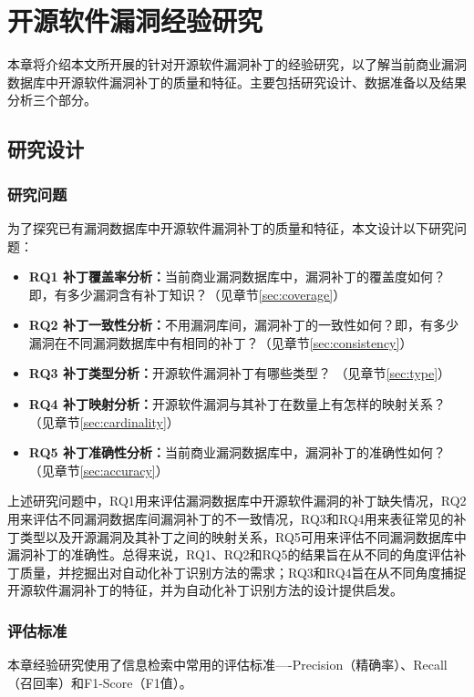 \chapter{开源软件漏洞经验研究}\label{sec:study}

本章将介绍本文所开展的针对开源软件漏洞补丁的经验研究，以了解当前商业漏洞数据库中开源软件漏洞补丁的质量和特征。主要包括研究设计、数据准备以及结果分析三个部分。


\section{研究设计}
\subsection{研究问题}
为了探究已有漏洞数据库中开源软件漏洞补丁的质量和特征，本文设计以下研究问题：

\begin{itemize}[leftmargin=*]
    \item \textbf{RQ1 补丁覆盖率分析：}当前商业漏洞数据库中，漏洞补丁的覆盖度如何？即，有多少漏洞含有补丁知识？（见章节\ref{sec:coverage}）
    \item \textbf{RQ2 补丁一致性分析：}不用漏洞库间，漏洞补丁的一致性如何？即，有多少漏洞在不同漏洞数据库中有相同的补丁？（见章节\ref{sec:consistency}）
    \item \textbf{RQ3 补丁类型分析：}开源软件漏洞补丁有哪些类型？ （见章节\ref{sec:type}）
    \item \textbf{RQ4 补丁映射分析：}开源软件漏洞与其补丁在数量上有怎样的映射关系？ （见章节\ref{sec:cardinality}）
    \item \textbf{RQ5 补丁准确性分析：}当前商业漏洞数据库中，漏洞补丁的准确性如何？ （见章节\ref{sec:accuracy}）
\end{itemize}
    
上述研究问题中，RQ1用来评估漏洞数据库中开源软件漏洞的补丁缺失情况，RQ2用来评估不同漏洞数据库间漏洞补丁的不一致情况，RQ3和RQ4用来表征常见的补丁类型以及开源漏洞及其补丁之间的映射关系，RQ5可用来评估不同漏洞数据库中漏洞补丁的准确性。总得来说，RQ1、RQ2和RQ5的结果旨在从不同的角度评估补丁质量，并挖掘出对自动化补丁识别方法的需求；RQ3和RQ4旨在从不同角度捕捉开源软件漏洞补丁的特征，并为自动化补丁识别方法的设计提供启发。

\subsection{评估标准}\label{sec:metric}
本章经验研究使用了信息检索中常用的评估标准----Precision（精确率）、Recall（召回率）和F1-Score（F1值）。

